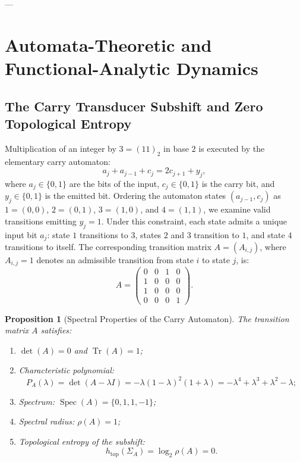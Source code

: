 \documentclass[11pt,reqno]{amsart}
\newtheorem{proposition}[theorem]{Proposition}
\theoremstyle{definition}
\numberwithin{equation}{section}
\begin{document}
---

\section{Automata-Theoretic and Functional-Analytic Dynamics}

\subsection{The Carry Transducer Subshift and Zero Topological Entropy}
Multiplication of an integer by $3 = (11)_2$ in base $2$ is executed by the elementary carry automaton:
\[
a_j + a_{j-1} + c_j = 2 c_{j+1} + y_j,
\]
where $a_j \in \{0, 1\}$ are the bits of the input, $c_j \in \{0, 1\}$ is the carry bit, and $y_j \in \{0, 1\}$ is the emitted bit.
Ordering the automaton states $(a_{j-1}, c_j)$ as $1 = (0, 0)$, $2 = (0, 1)$, $3 = (1, 0)$, and $4 = (1, 1)$, we examine valid transitions emitting $y_j = 1$. Under this constraint, each state admits a unique input bit $a_j$: state $1$ transitions to $3$, states $2$ and $3$ transition to $1$, and state $4$ transitions to itself. The corresponding transition matrix $A = (A_{i,j})$, where $A_{i,j} = 1$ denotes an admissible transition from state $i$ to state $j$, is:
\begin{equation}\label{eq:matrix_A}
A = \begin{pmatrix}
0 & 0 & 1 & 0 \\
1 & 0 & 0 & 0 \\
1 & 0 & 0 & 0 \\
0 & 0 & 0 & 1
\end{pmatrix}.
\end{equation}

\begin{proposition}[Spectral Properties of the Carry Automaton]\label{prop:spectral}
The transition matrix $A$ satisfies:
\begin{enumerate}
    \item $\det(A) = 0$ and $\operatorname{Tr}(A) = 1$;
    \item Characteristic polynomial:
    \begin{equation}
    P_A(\lambda) = \det(A - \lambda I) = -\lambda (1 - \lambda)^2 (1 + \lambda) = -\lambda^4 + \lambda^3 + \lambda^2 - \lambda;
    \end{equation}
    \item Spectrum: $\operatorname{Spec}(A) = \{0, 1, 1, -1\}$;
    \item Spectral radius: $\rho(A) = 1$;
    \item Topological entropy of the subshift:
    \begin{equation}
    h_{\mathrm{top}}(\Sigma_A) = \log_2 \rho(A) = 0.
    \end{equation}
\end{enumerate}
\end{proposition}
\end{document}
